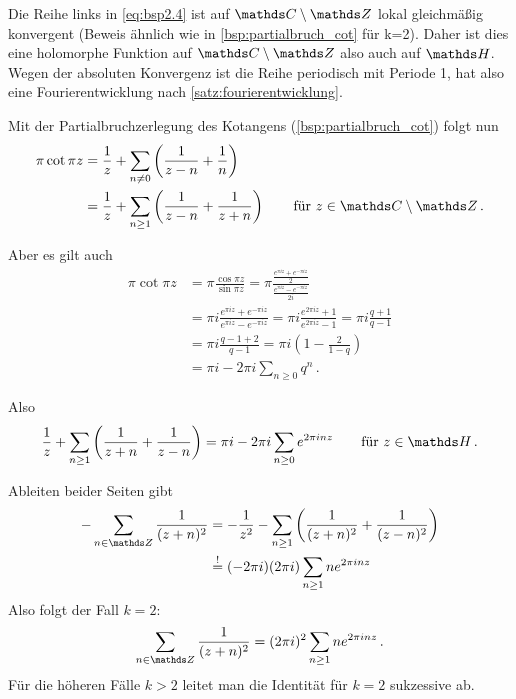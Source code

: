 \begin{bewe}
Die Reihe links in \eqref{eq:bsp2.4} ist auf $\CC\setminus\ZZ$ lokal gleichmäßig konvergent (Beweis ähnlich wie in \autoref{bsp:partialbruch_cot} für k=2). Daher ist dies eine holomorphe Funktion auf $\CC\setminus\ZZ$ also auch auf $\HH$. Wegen der absoluten Konvergenz ist die Reihe periodisch mit Periode 1, hat also eine Fourierentwicklung nach \autoref{satz:fourierentwicklung}.

Mit der Partialbruchzerlegung des Kotangens (\autoref{bsp:partialbruch_cot}) folgt nun
\begin{align*}
	\pi\cot \pi z
	&= \frac{1}{z} + \sum_{n\not=0} \left(\frac{1}{z-n} + \frac{1}{n}\right) \\
	&= \frac{1}{z} + \sum_{n\geq 1} \left(\frac{1}{z-n} + \frac{1}{z+n}\right)
	\qquad \text{für } z \in \CC\setminus\ZZ
	\,.
\end{align*}

Aber es gilt auch
\begin{align*}
	\pi \cot \pi z
	&= \pi \frac{\cos \pi z}{\sin \pi z}
	= \pi \frac{\frac{e^{\pi iz}+e^{-\pi iz}}{2}}{\frac{e^{\pi iz} - e^{-\pi iz}}{2i}} \\
	&= \pi i \frac{e^{\pi iz}+e^{-\pi iz}}{e^{\pi iz} - e^{-\pi iz}}
	= \pi i \frac{e^{2\pi iz}+1}{e^{2\pi iz}-1}
	= \pi i \frac{q+1}{q-1} \\
	&= \pi i \frac{q-1+2}{q-1}
	= \pi i \left(1-\frac{2}{1-q}\right)  \\
	&= \pi i - 2\pi i \sum_{n\geq 0} q^n
	\,.
\end{align*}

Also
\[
	\frac{1}{z} + \sum_{n\geq 1} \left(\frac{1}{z+n} + \frac{1}{z-n}\right)
	= \pi i - 2\pi i \sum_{n\geq 0} e^{2\pi inz}
	\qquad \text{für } z \in \HH
	\,.
\]

Ableiten beider Seiten gibt
\begin{align*}
	-\sum_{n\in\ZZ} \frac{1}{(z+n)^2}
	&= -\frac{1}{z^2} - \sum_{n\geq 1} \left(\frac{1}{(z+n)^2} + \frac{1}{(z-n)^2}\right) \\
	&\mystackrel{!}{=} (-2\pi i)(2\pi i) \sum_{n\geq 1} ne^{2\pi inz}
\end{align*}
Also folgt der Fall $k=2$:
\[
	\sum_{n\in\ZZ} \frac{1}{(z+n)^2}
	= (2\pi i)^2 \sum_{n\geq 1} ne^{2\pi inz}
	\,.
\]
Für die höheren Fälle $k > 2$ leitet man die Identität für $k=2$ sukzessive ab.
\end{bewe}